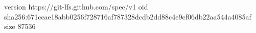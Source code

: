 version https://git-lfs.github.com/spec/v1
oid sha256:671ccae18abb0256f728716af787328dcdb2dd88c4e9cf06db22aa544a4085af
size 87536
